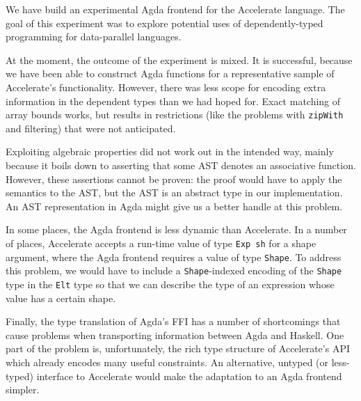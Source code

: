 \documentclass{llncs}
\begin{document}
We have build an experimental Agda frontend for the Accelerate
language. The goal of this experiment was to explore potential uses of
dependently-typed programming for data-parallel languages. 

At the moment, the outcome of the experiment is mixed. It is
successful, because we have been able to construct Agda functions for
a representative sample of Accelerate's functionality.
However, there was less scope for encoding extra information in the
dependent types than we had hoped for. Exact matching of array bounds
works, but results in restrictions (like the problems with
\texttt{zipWith} and filtering) that were not anticipated.

Exploiting algebraic properties did not work out in the intended way, mainly
because it boils down to asserting that some AST denotes an
associative function. However, these assertions cannot be proven: the
proof would have to apply the semantics to the AST, but the AST is an
abstract type in our implementation. An AST representation in Agda
might give us a better handle at this problem. 

In some places, the Agda frontend is less dynamic than Accelerate. In
a number of places, Accelerate accepts a run-time value of type
\texttt{Exp sh} for a shape argument, where the Agda frontend requires
a value of type \texttt{Shape}. To address this problem, we would have
to include a \texttt{Shape}-indexed encoding of the \texttt{Shape}
type in the \texttt{Elt} type so that we can describe the type of
an expression whose value has a certain shape. 

Finally, the type translation of Agda's FFI has a number of shortcomings that
cause problems when transporting information between Agda
and Haskell. One part of the problem is, unfortunately, the rich type
structure of Accelerate's API which already encodes many useful
constraints. An alternative, untyped (or less-typed) interface to
Accelerate would make the adaptation to an Agda frontend simpler.

%
%


\end{document}
